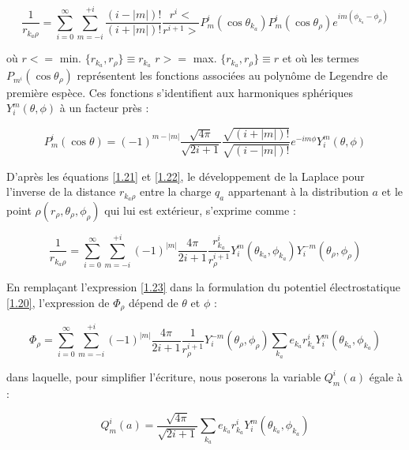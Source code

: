 	\begin{equation}
	\frac{1}{r_{k_{a}\rho}} = \sum_{i=0}^{\infty} \sum_{m=-i}^{+i} \frac{(i-|m|)!}{(i+ |m|)!} \frac{r^{i}<}{r^{i+1}>} P_{m}^{i} (\cos\theta_{k_{a}}) P^{i}_{m}(\cos\theta_{\rho})e^{im(\phi_{k_{a}}- \phi_{\rho})} \label{1.21}
	\end{equation}
	
	où $r< =$ min. $\{r_{k_{a}}, r_{\rho}\} \equiv r_{k_{a}}$
	$r> =$ max. $\{r_{k_{a}}, r_{\rho}\} \equiv r$
	et où les termes $P_{m^{i}} (\cos\theta_{\rho})$ représentent les fonctions associées au polynôme de Legendre de première espèce. Ces fonctions s'identifient aux harmoniques sphériques $Y_{i}^{m}(\theta,\phi)$ à un facteur près : 
	
	\begin{equation}
	P_{m}^{i}(\cos\theta) = (-1)^{m-|m|} \frac{\sqrt{4\pi}}{\sqrt{2i+ 1}} \frac{\sqrt{(i+ |m|)!}}{\sqrt{(i-|m|)!}} e^{-im\phi} Y_{i}^{m}(\theta,\phi) \label{1.22}
	\end{equation}
	
	D'après les équations \ref{1.21} et \ref{1.22}, le développement de la Laplace pour l'inverse de la distance $r_{k_{a}\rho}$ entre la charge $q_{a}$ appartenant à la distribution $a$ et le point $\rho(r_{\rho}, \theta_{\rho}, \phi_{\rho})$ qui lui est extérieur, s'exprime comme : 
	
	\begin{equation}
	\frac{1}{r_{k_{a}\rho}} = \sum_{i=0}^{\infty} \sum_{m=-i}^{+i} (-1)^{|m|} \frac{4\pi}{2i +1} \frac{r_{k_{a}}^{i}}{r_{\rho}^{i+1}} Y^{m}_{i} (\theta_{k_{a}}, \phi_{k_{a}}) Y_{i}^{-m} (\theta_{\rho},\phi_{\rho})  \label{1.23}
	\end{equation}
	
	En remplaçant l'expression \ref{1.23} dans la formulation du potentiel électrostatique \ref{1.20}, l'expression de $\Phi_{\rho}$ dépend de $\theta$ et $\phi$ : 
	
	\begin{equation}
	\Phi_{\rho} = \sum_{i=0}^{\infty} \sum_{m=-i}^{+i} (-1)^{|m|}\frac{4\pi}{2i +1} \frac{1}{r_{\rho}^{i+1}} Y_{i}^{-m} (\theta_{\rho},\phi_{\rho}) \sum_{k_{a}} e_{k_{a}}r^{i}_{k_{a}} Y^{m}_{i} (\theta_{k_{a}}, \phi_{k_{a}})
	\end{equation}
	
	dans laquelle, pour simplifier l'écriture, nous poserons la variable $Q_{m}^{i}(a)$ égale à : 
	
	\begin{equation}
	Q_{m}^{i}(a)= \frac{\sqrt{4\pi}}{\sqrt{2i + 1}} \sum_{k_{a}} e_{k_{a}}r_{k_{a}}^{i} Y_{i}^{m} (\theta_{k_{a}}, \phi_{k_{a}}) \label{1.25}
	\end{equation}
	
